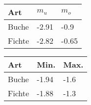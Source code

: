 \section*{}
\begin{frame}[c]

  \begin{center}
    \begin{minipage}{0.37\linewidth}
      \begin{tabular}{l l l}
        \toprule
        Art & \(m_u\) & \(m_o\) \\
        \midrule
        Buche & -2.91 & -0.9 \\
        Fichte & -2.82 & -0.65 \\
        \bottomrule
      \end{tabular}
    \end{minipage}
  \end{center}

  \begin{center}
    \begin{minipage}{0.33\linewidth}
      \begin{tabular}{l l l}
        \toprule
        Art & Min. & Max. \\
        \midrule
        Buche & -1.94 & -1.6 \\
        Fichte & -1.88 & -1.3 \\
        \bottomrule
      \end{tabular}
    \end{minipage}
  \end{center}

\end{frame}

